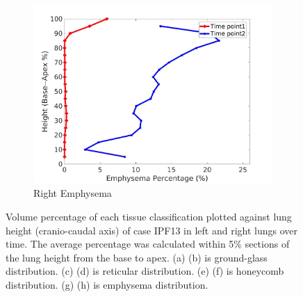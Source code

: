 \begin{figure}[H]
\begin{subfigure}{.42\linewidth}
  \includegraphics[width=\linewidth,trim={{.0\wd0} {.0\wd0} {.0\wd0} {.0\wd0}},clip]{Appendix/Image_AppexA/BaseToApex/IPF13RightLungEmphysemaDiseaseAgainstHeight.jpg}
  \caption{Right Emphysema}
  \label{fig:IPF13DiseaseAgainstHeight-h}
\end{subfigure}
\caption{Volume percentage of each tissue classification plotted against lung height (cranio-caudal axis) of case IPF13 in left and right lungs over time. The average percentage was calculated within 5\% sections of the lung height from the base to apex. (a) (b) is ground-glass distribution. (c) (d) is reticular distribution. (e) (f) is honeycomb distribution. (g) (h) is emphysema distribution.}
\label{fig:IPF13DiseaseAgainstHeight}
\end{figure}

